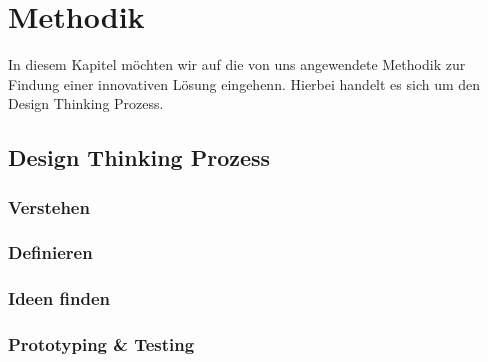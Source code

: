 \newpage

\section{Methodik} \label{methodik}
In diesem Kapitel möchten wir auf die von uns angewendete Methodik zur Findung einer innovativen Lösung eingehenn. Hierbei handelt es sich um den Design Thinking Prozess.

\subsection{Design Thinking Prozess} \label{designThinking}

\subsubsection{Verstehen} \label{verstehen}

\subsubsection{Definieren} \label{definieren}

\subsubsection{Ideen finden} \label{ideenFinden}

\subsubsection{Prototyping \& Testing} \label{prototypingTesting}
